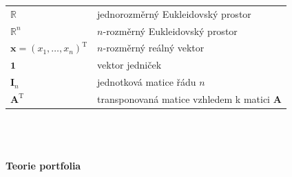 \documentclass[a4paper,12pt]{report}
\theoremstyle{definition} \newtheorem{definice}[veta]{Definice}
\theoremstyle{remark}
\begin{document}
   \begin{tabular}{p{4cm} p{9.3cm}}
   $\mathbb{R}$                              &   jednorozměrný Eukleidovský prostor \\
   $\mathbb{R}^n$                              &     $n$-rozměrný Eukleidovský prostor \\
   $\boldsymbol{x}=(x_1,\ldots,x_n)^\mathrm{T}$             &    $n$-rozměrný reálný vektor \\
    $\boldsymbol{1}$                           &   vektor jedniček\\
   $\mathbf{I}_n$                              &    jednotková matice řádu $n$ \\
   $\mathbf{A}^\mathrm{T}$                              &   transponovaná matice vzhledem k matici $\mathbf{A}$\\
   \end{tabular}\\\\\\
%
%
\textbf{Teorie portfolia}\\\\
\end{document}
